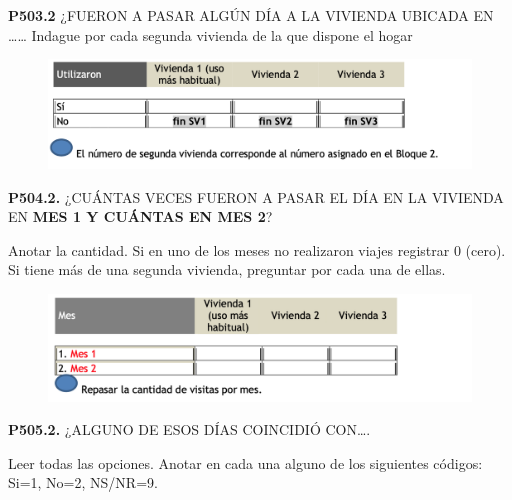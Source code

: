 \documentclass[
  openany]{book}
\begin{document}
\textbf{P503.2} ¿FUERON A PASAR ALGÚN DÍA A LA VIVIENDA UBICADA EN \ldots\ldots{}
Indague por cada segunda vivienda de la que dispone el hogar

\begin{figure}

{\centering \includegraphics[width=1\linewidth]{imagenes/figura6-192} 

}

\end{figure}

\textbf{P504.2.} ¿CUÁNTAS VECES FUERON A PASAR EL DÍA EN LA VIVIENDA EN \textbf{MES 1 Y CUÁNTAS EN MES 2}?

Anotar la cantidad. Si en uno de los meses no realizaron viajes registrar 0 (cero). Si tiene más de una segunda vivienda, preguntar por cada una de ellas.

\begin{figure}

{\centering \includegraphics[width=1\linewidth]{imagenes/figura6-193} 

}

\end{figure}

\textbf{P505.2.} ¿ALGUNO DE ESOS DÍAS COINCIDIÓ CON\ldots.

Leer todas las opciones. Anotar en cada una alguno de los siguientes códigos: Si=1, No=2, NS/NR=9.
\end{document}
